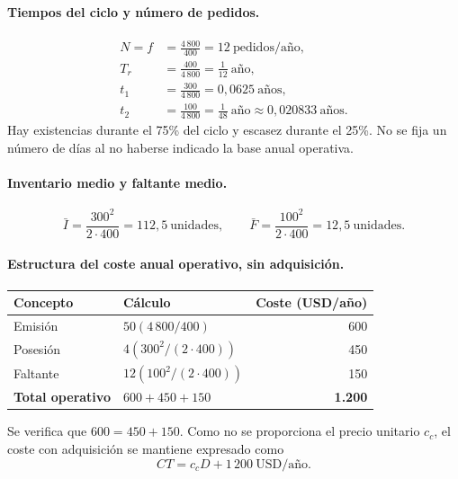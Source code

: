 \documentclass[11pt,a4paper]{article}
\begin{document}
\paragraph{Tiempos del ciclo y número de pedidos.}
\begin{align*}
    N=f & =\frac{4\,800}{400}=12\ \text{pedidos/año},   \\
    T_r & =\frac{400}{4\,800}=\frac{1}{12}\ \text{año}, \\
    t_1 & =\frac{300}{4\,800}=0{,}0625\ \text{años},    \\
    t_2 & =\frac{100}{4\,800}=\frac{1}{48}\ \text{año}
    \approx0{,}020833\ \text{años}.
\end{align*}
Hay existencias durante el 75\% del ciclo y escasez durante el 25\%. No se fija un número de días al no haberse indicado la base anual operativa.

\paragraph{Inventario medio y faltante medio.}
\[
    \bar{I}=\frac{300^2}{2\cdot400}=112{,}5\ \text{unidades},
    \qquad
    \bar{F}=\frac{100^2}{2\cdot400}=12{,}5\ \text{unidades}.
\]

\paragraph{Estructura del coste anual operativo, sin adquisición.}
\begin{center}
    \renewcommand{\arraystretch}{1.25}
    \begin{tabular}{@{}llr@{}}
        \toprule
        Concepto                 & Cálculo                 & Coste (USD/año) \\
        \midrule
        Emisión                  & $50(4\,800/400)$        & 600             \\
        Posesión                 & $4(300^2/(2\cdot400))$  & 450             \\
        Faltante                 & $12(100^2/(2\cdot400))$ & 150             \\
        \midrule
        \textbf{Total operativo} & $600+450+150$           & \textbf{1.200}  \\
        \bottomrule
    \end{tabular}
\end{center}
Se verifica que $600=450+150$. Como no se proporciona el precio unitario $c_c$, el coste con adquisición se mantiene expresado como
\[
    CT=c_cD+1\,200\ \text{USD/año}.
\]
\end{document}
